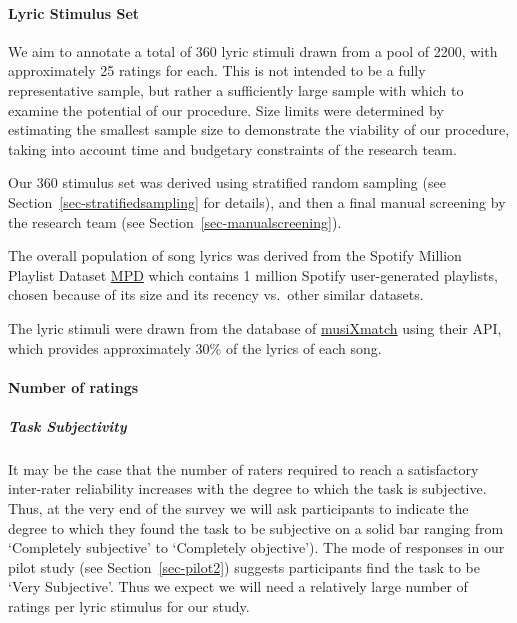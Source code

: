 \documentclass[
  letterpaper,
  DIV=11,
  numbers=noendperiod]{scrartcl}
\let\oldparagraph\paragraph
\renewcommand{\paragraph}[1]{\oldparagraph{#1}\mbox{}}
\let\oldsubparagraph\subparagraph
\renewcommand{\subparagraph}[1]{\oldsubparagraph{#1}\mbox{}}
\begin{document}
\hypertarget{lyric-stimulus-set}{%
\paragraph{Lyric Stimulus Set}\label{lyric-stimulus-set}}

We aim to annotate a total of 360 lyric stimuli drawn from a pool of
2200, with approximately 25 ratings for each. This is not intended to be
a fully representative sample, but rather a sufficiently large sample
with which to examine the potential of our procedure. Size limits were
determined by estimating the smallest sample size to demonstrate the
viability of our procedure, taking into account time and budgetary
constraints of the research team.

Our 360 stimulus set was derived using stratified random sampling (see
Section~\ref{sec-stratifiedsampling} for details), and then a final
manual screening by the research team (see
Section~\ref{sec-manualscreening}).

The overall population of song lyrics was derived from the Spotify
Million Playlist Dataset
\href{https://aicrowd.com/challenges/spotify-million-playlist-dataset-challenge}{MPD}
which contains 1 million Spotify user-generated playlists, chosen
because of its size and its recency vs.~other similar datasets.

The lyric stimuli were drawn from the database of
\href{https://musixmatch.com}{musiXmatch} using their API, which
provides approximately 30\% of the lyrics of each song.

\hypertarget{number-of-ratings}{%
\paragraph{Number of ratings}\label{number-of-ratings}}

\hypertarget{task-subjectivity}{%
\subparagraph{Task Subjectivity}\label{task-subjectivity}}

It may be the case that the number of raters required to reach a
satisfactory inter-rater reliability increases with the degree to which
the task is subjective. Thus, at the very end of the survey we will ask
participants to indicate the degree to which they found the task to be
subjective on a solid bar ranging from `Completely subjective' to
`Completely objective'). The mode of responses in our pilot study (see
Section~\ref{sec-pilot2}) suggests participants find the task to be
`Very Subjective'. Thus we expect we will need a relatively large number
of ratings per lyric stimulus for our study.
\end{document}
